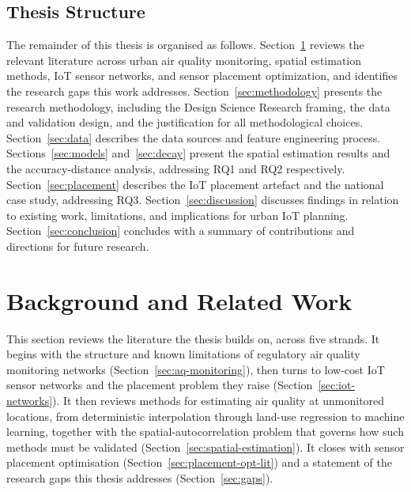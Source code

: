 \documentclass[11pt,a4paper]{article}
\let\oldsection\section
\renewcommand{\section}{\FloatBarrier\oldsection}
\let\oldsubsection\subsection
\renewcommand{\subsection}{\FloatBarrier\oldsubsection}
\begin{document}
\subsection{Thesis Structure}

The remainder of this thesis is organised as follows. Section~\ref{sec:background} reviews the relevant literature across urban air quality monitoring, spatial estimation methods, IoT sensor networks, and sensor placement optimization, and identifies the research gaps this work addresses. Section~\ref{sec:methodology} presents the research methodology, including the Design Science Research framing, the data and validation design, and the justification for all methodological choices. Section~\ref{sec:data} describes the data sources and feature engineering process. Sections~\ref{sec:models} and~\ref{sec:decay} present the spatial estimation results and the accuracy-distance analysis, addressing RQ1 and RQ2 respectively. Section~\ref{sec:placement} describes the IoT placement artefact and the national case study, addressing RQ3. Section~\ref{sec:discussion} discusses findings in relation to existing work, limitations, and implications for urban IoT planning. Section~\ref{sec:conclusion} concludes with a summary of contributions and directions for future research.

\section{Background and Related Work}
\label{sec:background}

This section reviews the literature the thesis builds on, across five strands. It begins with the structure and known limitations of regulatory air quality monitoring networks (Section~\ref{sec:aq-monitoring}), then turns to low-cost IoT sensor networks and the placement problem they raise (Section~\ref{sec:iot-networks}). It then reviews methods for estimating air quality at unmonitored locations, from deterministic interpolation through land-use regression to machine learning, together with the spatial-autocorrelation problem that governs how such methods must be validated (Section~\ref{sec:spatial-estimation}). It closes with sensor placement optimisation (Section~\ref{sec:placement-opt-lit}) and a statement of the research gaps this thesis addresses (Section~\ref{sec:gaps}).
\end{document}
